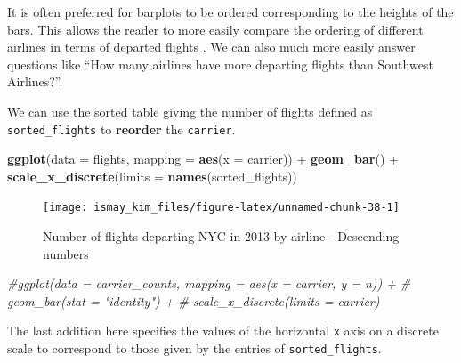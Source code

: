\documentclass[]{tufte-book}
\newenvironment{Shaded}{\begin{snugshade}}{\end{snugshade}}
\newcommand{\KeywordTok}[1]{\textcolor[rgb]{0.13,0.29,0.53}{\textbf{{#1}}}}
\newcommand{\DataTypeTok}[1]{\textcolor[rgb]{0.13,0.29,0.53}{{#1}}}
\newcommand{\StringTok}[1]{\textcolor[rgb]{0.31,0.60,0.02}{{#1}}}
\newcommand{\CommentTok}[1]{\textcolor[rgb]{0.56,0.35,0.01}{\textit{{#1}}}}
\newcommand{\NormalTok}[1]{{#1}}
\begin{document}
\begin{Shaded}
\end{Shaded}

It is often preferred for barplots to be ordered corresponding to the
heights of the bars. This allows the reader to more easily compare the
ordering of different airlines in terms of departed flights
\citep{robbins2013}. We can also much more easily answer questions like
``How many airlines have more departing flights than Southwest
Airlines?''.

We can use the sorted table giving the number of flights defined as
\texttt{sorted\_flights} to \textbf{reorder} the \texttt{carrier}.

\begin{Shaded}
\begin{Highlighting}[]
\KeywordTok{ggplot}\NormalTok{(}\DataTypeTok{data =} \NormalTok{flights, }\DataTypeTok{mapping =} \KeywordTok{aes}\NormalTok{(}\DataTypeTok{x =} \NormalTok{carrier)) +}
\StringTok{  }\KeywordTok{geom_bar}\NormalTok{() +}
\StringTok{  }\KeywordTok{scale_x_discrete}\NormalTok{(}\DataTypeTok{limits =} \KeywordTok{names}\NormalTok{(sorted_flights))}
\end{Highlighting}
\end{Shaded}

\begin{figure}
\texttt{[image: ismay\_kim\_files/figure-latex/unnamed-chunk-38-1]} \caption[Number of flights departing NYC in 2013 by airline - Descending numbers]{Number of flights departing NYC in 2013 by airline - Descending numbers}\label{fig:unnamed-chunk-38}
\end{figure}

\begin{Shaded}
\begin{Highlighting}[]
\CommentTok{#ggplot(data = carrier_counts, mapping = aes(x = carrier, y = n)) +}
\CommentTok{#  geom_bar(stat = "identity") + }
\CommentTok{#  scale_x_discrete(limits = carrier)}
\end{Highlighting}
\end{Shaded}

The last addition here specifies the values of the horizontal \texttt{x}
axis on a discrete scale to correspond to those given by the entries of
\texttt{sorted\_flights}.
\end{document}
